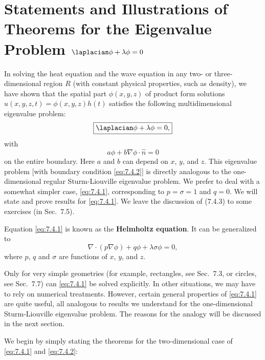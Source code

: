 \section{Statements and Illustrations of Theorems for the Eigenvalue Problem \texorpdfstring{$\laplacian\phi + \lambda\phi = 0$}{nabla squared phi + lambda phi = 0}}
\label{sec:7.4}

In solving the heat equation and the wave equation in any two- or three-dimensional region $R$ (with constant physical properties, such as density), we have shown that the spatial part $\phi(x,y,z)$ of product form solutions $u(x,y,z,t) = \phi(x,y,z)h(t)$ satisfies the following multidimensional eigenvalue problem:
\begin{equation}
\boxed{\laplacian\phi + \lambda\phi = 0,}
\label{eq:7.4.1}
\end{equation}
with
\begin{equation}
a\phi + b\nabla\phi\cdot\hat{n} = 0
\label{eq:7.4.2}
\end{equation}
on the entire boundary.  Here $a$ and $b$ can depend on $x$, $y$, and $z$.  This eigenvalue problem [with boundary condition \eqref{eq:7.4.2}] is directly analogous to the one-dimensional regular Sturm-Liouville eigenvalue problem.  We prefer to deal with a somewhat simpler case, \eqref{eq:7.4.1}, corresponding to $p = \sigma = 1$ and $q = 0$.  We will state and prove results for \eqref{eq:7.4.1}.  We leave the discussion of (7.4.3) to some exercises (in Sec.~7.5).

Equation \eqref{eq:7.4.1} is known as the \textbf{Helmholtz equation}.  It can be generalized to
\begin{equation}
\nabla\cdot(p\nabla\phi) + q\phi + \lambda\sigma\phi = 0,
\label{eq:7.4.3}
\end{equation}
where $p$, $q$ and $\sigma$ are functions of $x$, $y$, and $z$.

Only for very simple geometries (for example, rectangles, see Sec.~7.3, or circles, see Sec.~7.7) can \eqref{eq:7.4.1} be solved explicitly.  In other situations, we may have to rely on numerical treatments.  However, certain general properties of \eqref{eq:7.4.1} are quite useful, all analogous to results we understand for the one-dimensional Sturm-Liouville eigenvalue problem.  The reasons for the analogy will be discussed in the next section.

We begin by simply stating the theorems for the two-dimensional case of \eqref{eq:7.4.1} and \eqref{eq:7.4.2}:

